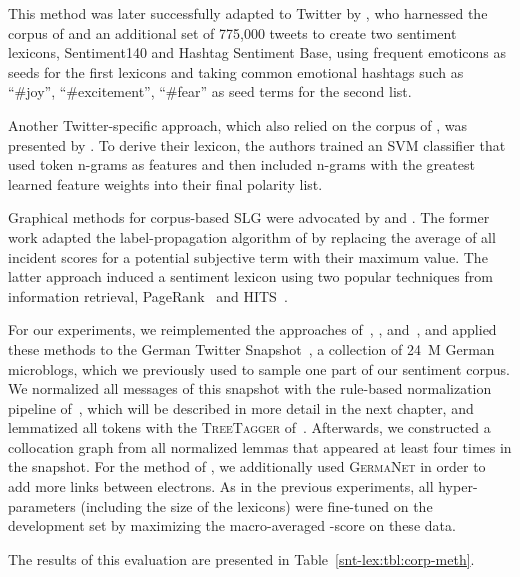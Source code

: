 This method was later successfully adapted to Twitter by
\citet{Kiritchenko:14}, who harnessed the corpus of \citet{Go:09} and
an additional set of 775,000 tweets to create two sentiment lexicons,
Sentiment140 and Hashtag Sentiment Base, using frequent emoticons as
seeds for the first lexicons and taking common emotional hashtags such
as ``\#joy'', ``\#excitement'', ``\#fear'' as seed terms for the
second list.

Another Twitter-specific approach, which also relied on the corpus of
\citet{Go:09}, was presented by \citet{Severyn:15a}.  To derive their
lexicon, the authors trained an SVM classifier that used token n-grams
as features and then included n-grams with the greatest learned
feature weights into their final polarity list.

Graphical methods for corpus-based SLG were advocated by
\citet{Velikovich:10} and \citet{Feng:11}.  The former work adapted
the label-propagation algorithm of \citet{Rao:09} by replacing the
average of all incident scores for a potential subjective term with
their maximum value.  The latter approach induced a sentiment lexicon
using two popular techniques from information retrieval,
PageRank~\cite{Brin:98} and HITS~\cite{Kleinberg:99}.

For our experiments, we reimplemented the approaches
of~\citet{Takamura:05}, \citet{Velikovich:10}, \citet{Kiritchenko:14}
and~\citet{Severyn:15}, and applied these methods to the German
Twitter Snapshot~\cite{Scheffler:14}, a collection of 24~M German
microblogs, which we previously used to sample one part of our
sentiment corpus.  We normalized all messages of this snapshot with
the rule-based normalization pipeline of~\citet{Sidarenka:13}, which
will be described in more detail in the next chapter, and lemmatized
all tokens with the \textsc{TreeTagger} of~\citet{Schmid:95}.
Afterwards, we constructed a collocation graph from all normalized
lemmas that appeared at least four times in the snapshot.  For the
method of \citet{Takamura:05}, we additionally used \textsc{GermaNet}
in order to add more links between electrons.  As in the previous
experiments, all hyper-parameters (including the size of the lexicons)
were fine-tuned on the development set by maximizing the
macro-averaged \F{}-score on these data.

The results of this evaluation are presented in
Table~\ref{snt-lex:tbl:corp-meth}.


